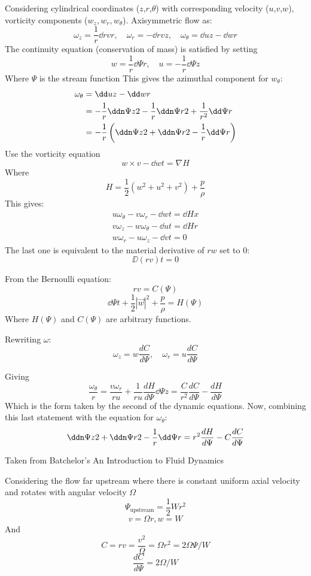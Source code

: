 \documentclass{X:/Documents/Coding/Latex/myreport}
\begin{document}
Considering cylindrical coordinates ($z$,$r$,$\theta$) with corresponding velocity ($u$,$v$,$w$), vorticity components ($w_z,w_r,w_\theta$). Axisymmetric flow as:
\[\omega_z = \frac1r \dd{rv}{r}, \quad \omega_r = -\dd{rv}{z},\quad \omega_\theta = \dd{u}{z} - \dd{w}{r}\]
The continuity equation (conservation of mass) is satisfied by setting
\[w =\frac1r \dd\Psi{r} , \quad u=-\frac1r \dd\Psi{z}\]
Where $\Psi$ is the stream function
This gives the azimuthal component for $w_\theta$:
\begin{align*}
    \omega_\theta &= \dd uz - \dd wr\\
    &= -\frac1r \ddn\Psi z2 - \frac1r \ddn \Psi r2 + \frac{1}{r^2} \dd\Psi r\\
    &= -\frac1r\left(\ddn\Psi z2 + \ddn \Psi r2 - \frac1r\dd\Psi r\right)
\end{align*}
Use the vorticity equation
\[w \times v - \dd wt = \nabla H\]
Where 
\[H = \frac12 (w^2 + u^2 + v^2) + \frac p\rho \]
This gives:
\begin{align*}
    u\omega_\theta - v\omega_r - \dd wt = \dd Hx\\
    v \omega_z - w \omega_\theta - \dd ut = \dd Hr\\
    w\omega_r - u \omega_z - \dd vt = 0
\end{align*}
The last one is equivalent to the material derivative of $rw$ set to 0:
\[\DD{(rv)}{t} = 0\]

From the Bernoulli equation:
\[rv = C(\Psi)\]
\[\dd{\Psi}{t} + \frac12 |\vec w|^2 + \frac{p}{\rho} = H(\Psi)\]
Where $H(\Psi)$ and $C(\Psi)$ are arbitrary functions.

Rewriting $\omega$:
\[\omega_z = w \frac{dC}{d\Psi}, \quad \omega_r = u \frac{dC}{d\Psi}\]
 

Giving
\[\frac{\omega_\theta}{r} = \frac{v\omega_r}{ru} + \frac1{ru}\frac{dH}{d\Psi} \dd\Psi z = \frac{C}{r^2} \frac{dC}{d\Psi} - \frac{dH}{d\Psi}\]
Which is the form taken by the second of the dynamic equations.
Now, combining this last statement with the equation for $\omega_\theta$:
\[\ddn \Psi z 2 + \ddn \Psi r2 - \frac1r \dd\Psi r= r^2 \frac{dH}{d\Psi} - C\frac{dC}{d\Psi}\]


Taken from Batchelor's An Introduction to Fluid Dynamics


Considering the flow far upstream where there is constant uniform axial velocity and rotates with angular velocity $\Omega$ 
\[\Psi_{\text{upstream}} = \frac12 W r^2\]
\[v = \Omega r, w =W\]
And
\[C = rv =  \frac{v^2}{\Omega} = \Omega r^2 = 2\Omega \Psi/W \]
\[\frac{dC}{d\Psi} = 2\Omega/W\]
\end{document}
